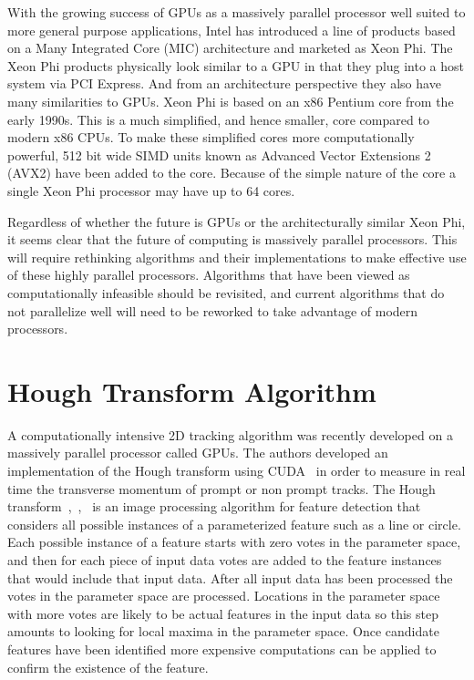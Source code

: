 \documentclass{JINST}
\begin{document}
With the growing success of GPUs as a massively parallel processor well suited to more general purpose applications, Intel has introduced a line of products based on a Many Integrated Core (MIC) architecture and marketed as Xeon Phi.  The Xeon Phi products physically look similar to a GPU in that they plug into a host system via PCI Express.  And from an architecture perspective they also have many similarities to GPUs.  Xeon Phi is based on an x86 Pentium core from the early 1990s.  This is a much simplified, and hence smaller, core compared to modern x86 CPUs.  To make these simplified cores more computationally powerful, 512 bit wide SIMD units known as Advanced Vector Extensions 2 (AVX2) have been added to the core.  Because of the simple nature of the core a single Xeon Phi processor may have up to 64 cores.

Regardless of whether the future is GPUs or the architecturally similar Xeon Phi, it seems clear that the future of computing is massively parallel processors.  This will require rethinking algorithms and their implementations to make effective use of these highly parallel processors.  Algorithms that have been viewed as computationally infeasible should be revisited, and current algorithms that do not parallelize well will need to be reworked to take advantage of modern processors.

\section{Hough Transform Algorithm}

 A computationally intensive 2D tracking algorithm was recently developed on a massively parallel processor called GPUs. The authors developed an implementation of the Hough transform using CUDA~\cite{Halyo:2013} in order to measure in real time the transverse momentum of prompt or non prompt tracks.  The Hough transform~\cite{bib:HT1},~\cite{bib:HT2},~\cite{bib:HT3} is an image processing algorithm for feature detection that considers all possible instances of a parameterized feature such as a line or circle.  Each possible instance of a feature starts with zero votes in the parameter space, and then for each piece of input data votes are added to the feature instances that would include that input data.  After all input data has been processed the votes in the parameter space are processed.  Locations in the parameter space with more votes are likely to be actual features in the input data so this step amounts to looking for local maxima in the parameter space.  Once candidate features have been identified more expensive computations can be applied to confirm the existence of the feature.
\end{document}
